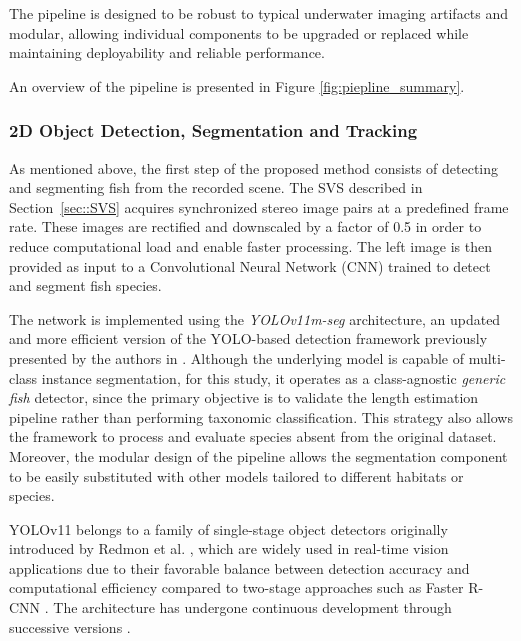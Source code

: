 \documentclass[utf8]{FrontiersinHarvard} %
\begin{document}
 The pipeline is designed to be robust to typical underwater imaging artifacts and modular, allowing individual components to be upgraded or replaced while maintaining deployability and reliable performance.

An overview of the pipeline is presented in Figure \ref{fig:piepline_summary}.


\subsubsection{2D Object Detection, Segmentation and Tracking}\label{subsec::network}


As mentioned above, the first step of the proposed method consists of detecting and segmenting fish from the recorded scene. The SVS described in Section~\ref{sec::SVS} acquires synchronized stereo image pairs at a predefined frame rate. These images are rectified and downscaled by a factor of 0.5 in order to reduce computational load and enable faster processing. The left image is then provided as input to a Convolutional Neural Network (CNN) trained to detect and segment fish species. 


The network is implemented using the \textit{YOLOv11m-seg} architecture, an updated and more efficient version of the YOLO-based detection framework previously presented by the authors in \citep{muntaner2025automatic}. Although the underlying model is capable of multi-class instance segmentation, for this study, it operates as a class-agnostic \textit{generic fish} detector, since the primary objective is to validate the length estimation pipeline rather than performing taxonomic classification. This strategy also allows the framework to process and evaluate species absent from the original dataset. Moreover, the modular design of the pipeline allows the segmentation component to be easily substituted with other models tailored to different habitats or species. 

YOLOv11 \citep{khanam2024yolov11,yolo11_ultralytics} belongs to a family of single-stage object detectors originally introduced by Redmon et al. \citep{redmon2016you}, which are widely used in real-time vision applications due to their favorable balance between detection accuracy and computational efficiency compared to two-stage approaches such as Faster R-CNN \citep{ren2015faster}. The architecture has undergone continuous development through successive versions \citep{redmon2018YOLOv3, bochkovskiy2020YOLOv4, jocher2020ultralytics, wang2022YOLOv7, YOLOv8_ultralytics, sapkota2025yolo26}.
\end{document}

